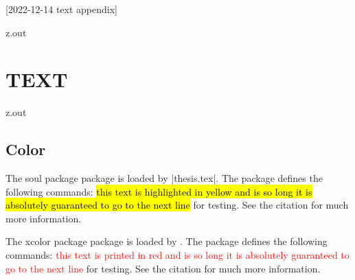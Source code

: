 [2022-12-14 text appendix]

\begin{VerbatimOut}{z.out}
\chapter{TEXT}

\end{VerbatimOut}

\MyIO


\begin{VerbatimOut}{z.out}


\section{Color}

The soul package \cite{franz2003} package is loaded by |thesis.tex|.
The package defines the following commands:
\hl{%
  this text is highlighted in yellow
  and is so long it is absolutely guaranteed
  to go to the next line%
} for testing.
See the citation for much more information.

The xcolor package \cite{kern2021} package is loaded by \PurdueThesisLogo.
The package defines the following commands:
\textcolor{red}{%
  this text is printed in red
  and is so long it is absolutely guaranteed
  to go to the next line%
} for testing.
See the citation for much more information.
\end{VerbatimOut}

\MyIO
  

